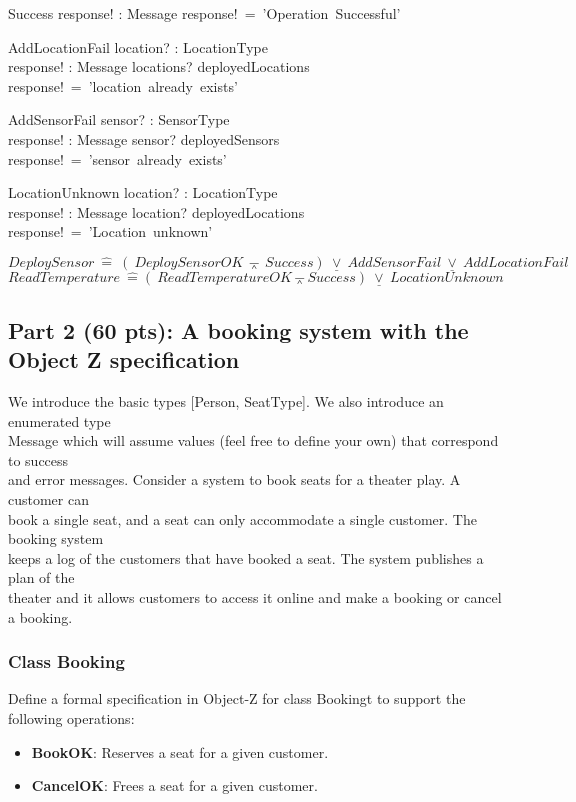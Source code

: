 \documentclass[12pt]{article}
\begin{document}
\begin{class}{Success}
response! : Message
\ST
response!~=~'Operation~Successful'
\end{class}
\begin{class}{AddLocationFail}
location? : LocationType\\
response! : Message
\ST
locations? \in deployedLocations\\
response!~=~'location~already~exists'\\
\end{class}
\begin{class}{AddSensorFail}
sensor? : SensorType\\
response! : Message
\ST
sensor? \in deployedSensors\\
response!~=~'sensor~already~exists'
\end{class}
\begin{class}{LocationUnknown}
location? : LocationType\\
response! : Message
\ST
location? \notin deployedLocations\\
response!~=~'Location~unknown'
\end{class}
$DeploySensor~\hat{=}~(~DeploySensorOK~\barwedge~Success)~\underline{\vee}~AddSensorFail~\underline{\vee}~AddLocationFail$\\
$ReadTemperature~\hat{=} (~ReadTemperatureOK \barwedge Success)~\underline{\vee}~ LocationUnknown$
\newpage
\subsection{Part 2 (60 pts): A booking system with the Object Z specification}

\noindent We introduce the basic types [Person, SeatType]. We also introduce an enumerated type\\
Message which will assume values (feel free to define your own) that correspond to success\\
and error messages. Consider a system to book seats for a theater play. A customer can\\
book a single seat, and a seat can only accommodate a single customer. The booking system\\
keeps a log of the customers that have booked a seat. The system publishes a plan of the\\
theater and it allows customers to access it online and make a booking or cancel a booking.\\
\subsubsection{Class Booking}
\noindent Define a formal specification in Object-Z for class Bookingt to support the following operations:
\begin{itemize}
	\item \textbf{BookOK}: Reserves a seat for a given customer.
	\item \textbf{CancelOK}: Frees a seat for a given customer.
\end{itemize}
\end{document}

